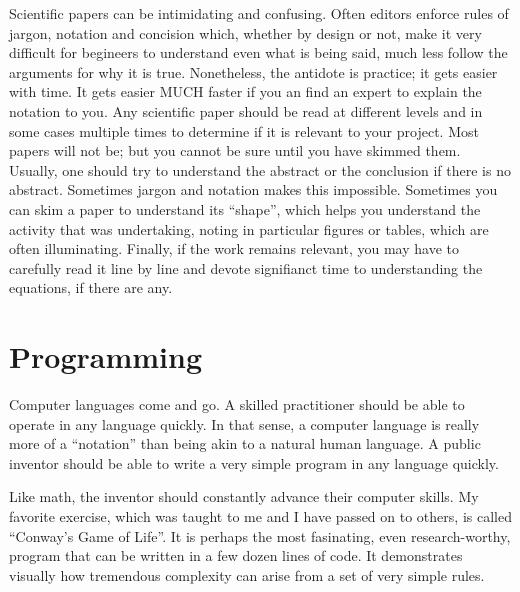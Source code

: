 \documentclass[
	fontsize=10pt, %
	twoside=false, %
	secnumdepth=1, %
]{kaobook}
\begin{document}
Scientific papers can be intimidating and confusing.
Often editors enforce rules of jargon, notation and concision which,
whether by design or not, make it very difficult for begineers to
understand even what is being said, much less follow the arguments for
why it is true.
Nonetheless, the antidote is practice; it gets easier with time.
It gets easier MUCH faster if you an find an expert to explain the notation to
you.
Any scientific paper should be read at different levels and in some cases
multiple times to determine if it is relevant to your project.
Most papers will not be; but you cannot be sure until you have skimmed them.
Usually, one should try to understand the abstract or the
conclusion if there is no abstract. Sometimes jargon and notation makes
this impossible. Sometimes you can skim a paper to understand its ``shape'', which
helps you understand the activity that was undertaking, noting in particular
figures or tables, which are often illuminating.
Finally, if the work remains relevant, you may have to carefully read it line
by line and devote signifianct time to understanding the equations, if there
are any.

\section{Programming}

Computer languages come and go. A skilled practitioner should be
able to operate in any language quickly. In that sense, a computer language
is really more of a ``notation'' than being akin to a natural human language.
A public inventor should be able to write a very simple program in
any language quickly.

Like math, the inventor should constantly advance their computer skills.
My favorite exercise, which was taught to me and I have passed on to others,
is called ``Conway's Game of Life''. It is perhaps the most fasinating,
even research-worthy,
program that can be written in a few dozen lines of code.
It demonstrates visually how tremendous complexity can arise from a set
of very simple rules.
\end{document}
